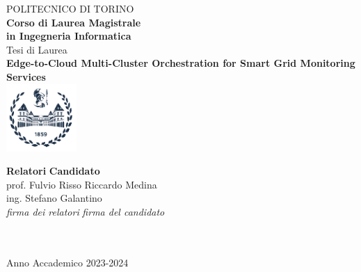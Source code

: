 \begin{titlepage}

\begin{center}

{\huge POLITECNICO DI TORINO}\\[1.5cm]
\textbf{Corso di Laurea Magistrale\\in Ingegneria Informatica}\\[3cm]

{\Large Tesi di Laurea}\\[1cm]
\textbf{\LARGE Edge-to-Cloud Multi-Cluster Orchestration for Smart Grid Monitoring Services  }\\[2cm]
\includegraphics[width=0.2\textwidth]{./Pictures/logo_polito_2021.jpg}
\vspace{4cm}


\begin{minipage}{0.85\textwidth}
\begin{flushleft}\large
\textbf{Relatori} \hfill \textbf{Candidato}\\
prof. Fulvio Risso \hfill Riccardo Medina\\
ing. Stefano Galantino \\
\textit{firma dei relatori} \hfill \textit{firma del candidato}\\[0.35cm]
\fillin\ \hfill \\
\fillin\ \hfill \fillin
\end{flushleft}
\end{minipage}

\vfill

Anno Accademico 2023-2024
\end{center}

\restoregeometry %

\end{titlepage}